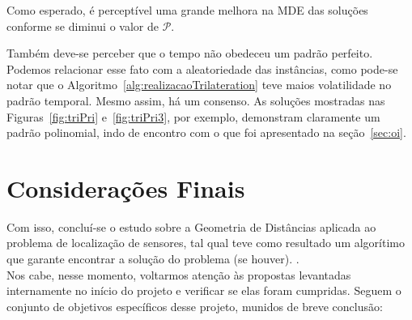 \documentclass[a4paper,12pt]{report}
\begin{document}
	Como esperado, é perceptível uma grande melhora na MDE das soluções conforme se diminui o valor de $\mathcal{P}$. 
	
	Também deve-se perceber que o tempo não obedeceu um padrão perfeito. Podemos relacionar esse fato com a aleatoriedade das instâncias, como pode-se notar que o Algoritmo~\ref{alg:realizacaoTrilateration} teve maios volatilidade no padrão temporal. Mesmo assim, há um consenso. As soluções mostradas nas Figuras~\ref{fig:triPri} e~\ref{fig:triPri3}, por exemplo, demonstram claramente um padrão polinomial, indo de encontro com o que foi apresentado na seção~\ref{sec:oi}.
	
	\newpage
	\chapter{Considerações Finais}
	Com isso, concluí-se o estudo sobre a Geometria de Distâncias aplicada ao problema de localização de sensores, tal qual teve como resultado um algorítimo que garante encontrar a solução do problema (se houver). .
	\\
	
	Nos cabe, nesse momento, voltarmos atenção às propostas levantadas internamente no início do projeto e verificar se elas foram cumpridas. Seguem o conjunto de objetivos específicos desse projeto, munidos de breve conclusão:
	
\end{document}
